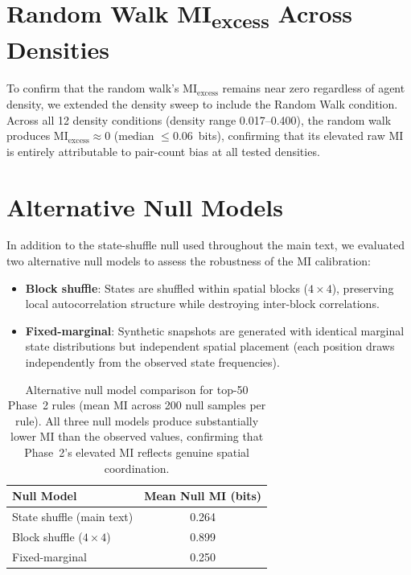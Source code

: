 \documentclass[letterpaper]{article}
\begin{document}
\section{Random Walk MI\textsubscript{excess} Across Densities}
\label{app:rw_density}

To confirm that the random walk's $\mathrm{MI}_{\mathrm{excess}}$ remains
near zero regardless of agent density, we extended the density sweep to
include the Random Walk condition.  Across all 12 density conditions
(density range 0.017--0.400), the random walk produces
$\mathrm{MI}_{\mathrm{excess}} \approx 0$ (median $\leq 0.06$~bits),
confirming that its elevated raw MI is entirely attributable to
pair-count bias at all tested densities.

\section{Alternative Null Models}
\label{app:alt_nulls}

In addition to the state-shuffle null used throughout the main text, we
evaluated two alternative null models to assess the robustness of the MI
calibration:

\begin{itemize}
  \item \textbf{Block shuffle}: States are shuffled within spatial blocks
        ($4 \times 4$), preserving local autocorrelation structure while
        destroying inter-block correlations.
  \item \textbf{Fixed-marginal}: Synthetic snapshots are generated with
        identical marginal state distributions but independent spatial
        placement (each position draws independently from the observed
        state frequencies).
\end{itemize}

\begin{table}[htbp]
\centering
\caption{Alternative null model comparison for top-50 Phase~2 rules
(mean MI across 200 null samples per rule).  All three null models
produce substantially lower MI than the observed values, confirming
that Phase~2's elevated MI reflects genuine spatial coordination.}
\label{tab:alt_nulls}
\begin{tabular}{lc}
\toprule
Null Model & Mean Null MI (bits) \\
\midrule
State shuffle (main text) & 0.264 \\
Block shuffle ($4 \times 4$) & 0.899 \\
Fixed-marginal & 0.250 \\
\bottomrule
\end{tabular}
\end{table}
\end{document}
